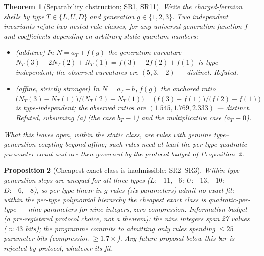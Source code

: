 \documentclass[12pt]{article}
\newtheorem{theorem}{Theorem}
\newtheorem{proposition}[theorem]{Proposition}
\theoremstyle{definition}
\theoremstyle{remark}
\begin{document}
\begin{theorem}[Separability obstruction; SR1, SR11]\label{thm:curv}
Write the charged-fermion shells by type $T \in \{L, U, D\}$ and generation $g \in \{1,2,3\}$. Two independent invariants refute two nested rule classes, for \emph{any} universal generation function $f$ and coefficients depending on arbitrary static quantum numbers:
\begin{itemize}
\item[(a)] (\emph{additive}) In $N = a_T + f(g)$ the generation curvature $N_T(3) - 2N_T(2) + N_T(1) = f(3) - 2f(2) + f(1)$ is type-independent; the observed curvatures are $(5, 3, -2)$ --- distinct. Refuted.
\item[(b)] (\emph{affine, strictly stronger}) In $N = a_T + b_T\,f(g)$ the anchored ratio $\bigl(N_T(3) - N_T(1)\bigr)/\bigl(N_T(2) - N_T(1)\bigr) = \bigl(f(3) - f(1)\bigr)/\bigl(f(2) - f(1)\bigr)$ is type-independent; the observed ratios are $(1.545, 1.769, 2.333)$ --- distinct. Refuted, subsuming (a) (the case $b_T \equiv 1$) and the multiplicative case ($a_T \equiv 0$).
\end{itemize}
What this leaves open, within the static class, are rules with genuine type--generation \emph{coupling} beyond affine; such rules need at least the per-type-quadratic parameter count and are then governed by the protocol budget of Proposition~\ref{prop:budget}.
\end{theorem}

\begin{proposition}[Cheapest exact class is inadmissible; SR2--SR3]\label{prop:budget}
Within-type generation steps are unequal for all three types ($L: -11, -6$; $U: -13, -10$; $D: -6, -8$), so per-type \emph{linear-in-$g$} rules (six parameters) admit no exact fit; within the per-type polynomial hierarchy the cheapest exact class is quadratic-per-type --- nine parameters for nine integers, zero compression. Information budget (a pre-registered protocol choice, not a theorem): the nine integers span 27 values ($\approx 43$ bits); the programme commits to admitting only rules spending $\le 25$ parameter bits (compression $\ge 1.7\times$). Any future proposal below this bar is rejected by protocol, whatever its fit.
\end{proposition}
\end{document}

